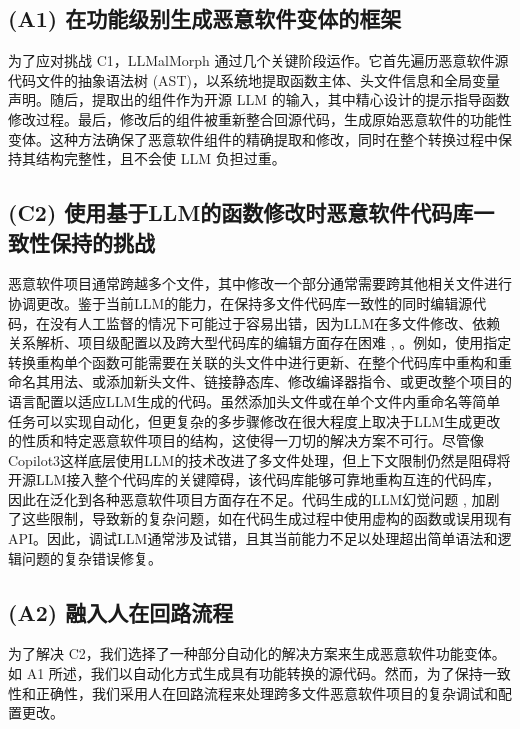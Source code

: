 \subsection{(A1) 在功能级别生成恶意软件变体的框架}
为了应对挑战 C1，LLMalMorph 通过几个关键阶段运作。它首先遍历恶意软件源代码文件的抽象语法树 (AST)，以系统地提取函数主体、头文件信息和全局变量声明。随后，提取出的组件作为开源 LLM 的输入，其中精心设计的提示指导函数修改过程。最后，修改后的组件被重新整合回源代码，生成原始恶意软件的功能性变体。这种方法确保了恶意软件组件的精确提取和修改，同时在整个转换过程中保持其结构完整性，且不会使 LLM 负担过重。

\subsection{(C2) 使用基于LLM的函数修改时恶意软件代码库一致性保持的挑战}
恶意软件项目通常跨越多个文件，其中修改一个部分通常需要跨其他相关文件进行协调更改。鉴于当前LLM的能力，在保持多文件代码库一致性的同时编辑源代码，在没有人工监督的情况下可能过于容易出错，因为LLM在多文件修改、依赖关系解析、项目级配置以及跨大型代码库的编辑方面存在困难 \parencite{Jiang2024}, \parencite{Jimenez2024}。例如，使用指定转换重构单个函数可能需要在关联的头文件中进行更新、在整个代码库中重构和重命名其用法、或添加新头文件、链接静态库、修改编译器指令、或更改整个项目的语言配置以适应LLM生成的代码。虽然添加头文件或在单个文件内重命名等简单任务可以实现自动化，但更复杂的多步骤修改在很大程度上取决于LLM生成更改的性质和特定恶意软件项目的结构，这使得一刀切的解决方案不可行。尽管像Copilot3这样底层使用LLM的技术改进了多文件处理，但上下文限制仍然是阻碍将开源LLM接入整个代码库的关键障碍，该代码库能够可靠地重构互连的代码库，因此在泛化到各种恶意软件项目方面存在不足。代码生成的LLM幻觉问题 \parencite{Ji2023}, \parencite{Liu2024} 加剧了这些限制，导致新的复杂问题，如在代码生成过程中使用虚构的函数或误用现有API。因此，调试LLM通常涉及试错，且其当前能力不足以处理超出简单语法和逻辑问题的复杂错误修复。

\subsection{(A2) 融入人在回路流程}
为了解决 C2，我们选择了一种部分自动化的解决方案来生成恶意软件功能变体。如 A1 所述，我们以自动化方式生成具有功能转换的源代码。然而，为了保持一致性和正确性，我们采用人在回路流程来处理跨多文件恶意软件项目的复杂调试和配置更改。